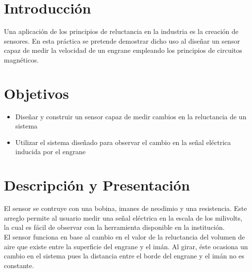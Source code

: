 \section{Introducci\'on}
Una aplicaci\'on de los principios de reluctancia en la industria es la creaci\'on de sensores.
En esta pr\'actica se pretende demostrar dicho uso al dise\~nar un sensor capaz de medir
la velocidad de un engrane empleando los principios de circuitos magn\'eticos.

\section{Objetivos}
\begin{itemize}
 \item Dise\~nar y construir un sensor capaz de medir cambios en la reluctancia de un sistema
 \item Utilizar el sistema dise\~nado para observar el cambio en la se\~nal el\'ectrica inducida por el engrane
\end{itemize}

\section{Descripci\'on y Presentaci\'on}
El sensor se contruye con una bobina, imanes de neodimio y una resistencia. Este arreglo permite al usuario medir una
se\~nal el\'ectrica en la escala de los milivolts, la cual es f\'acil de observar con la herramienta disponible en
la instituci\'on.\\
El sensor funciona en base al cambio en el valor de la reluctancia del volumen de aire que existe entre la superficie
del engrane y el im\'an. Al girar, \'este ocasiona un cambio en el sistema pues la distancia entre el borde del engrane
y el im\'an no es constante.